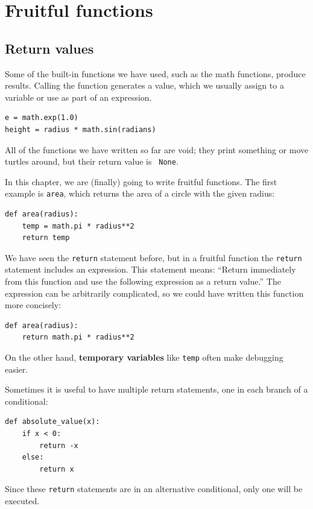 \documentclass[10pt]{book}
\begin{document}
\chapter{Fruitful functions}
\label{fruitchap}

\section{Return values}

Some of the built-in functions we have used, such as the math
functions, produce results.  Calling the function generates a
value, which we usually assign to a variable or use as part of an
expression.

\beforeverb
\begin{verbatim}
e = math.exp(1.0)
height = radius * math.sin(radians)
\end{verbatim}
\afterverb
%
All of the functions we have written so far are void; they print
something or move turtles around, but their return value is {\tt
None}.

In this chapter, we are (finally) going to write fruitful functions.
The first example is {\tt area}, which returns the area of a circle
with the given radius:

\beforeverb
\begin{verbatim}
def area(radius):
    temp = math.pi * radius**2
    return temp
\end{verbatim}
\afterverb
%
We have seen the {\tt return} statement before, but in a fruitful
function the {\tt return} statement includes
an expression.  This statement means: ``Return immediately from
this function and use the following expression as a return value.''
The expression can be arbitrarily complicated, so we could
have written this function more concisely:


\beforeverb
\begin{verbatim}
def area(radius):
    return math.pi * radius**2
\end{verbatim}
\afterverb
%
On the other hand, {\bf temporary variables} like {\tt temp} often make
debugging easier.


Sometimes it is useful to have multiple return statements, one in each
branch of a conditional:

\beforeverb
\begin{verbatim}
def absolute_value(x):
    if x < 0:
        return -x
    else:
        return x
\end{verbatim}
\afterverb
%
Since these {\tt return} statements are in an alternative conditional,
only one will be executed.
\end{document}
